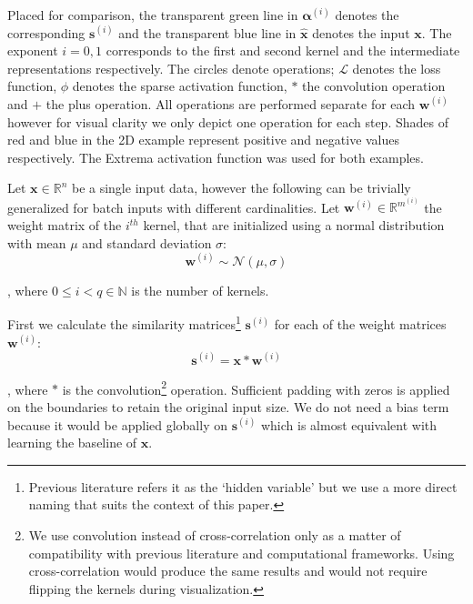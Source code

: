 \documentclass[journal]{IEEEtran}
\begin{document}
\begin{figure*}[!t]
{	Placed for comparison, the transparent green line in $\bm{\alpha}^{(i)}$ denotes the corresponding $\bm{s}^{(i)}$ and the transparent blue line in $\hat{\bm{x}}$ denotes the input $\bm{x}$.
	The exponent $i=0,1$ corresponds to the first and second kernel and the intermediate representations respectively.
	The circles denote operations; $\mathcal{L}$ denotes the loss function, $\phi$ denotes the sparse activation function, $\ast$ the convolution operation and $+$ the plus operation.
	All operations are performed separate for each $\bm{w}^{(i)}$ however for visual clarity we only depict one operation for each step.
	Shades of red and blue in the 2D example represent positive and negative values respectively.
	The Extrema activation function was used for both examples.
	}
	\label{fig:sans}
\end{figure*}

Let $\bm{x} \in \mathbb{R}^n$ be a single input data, however the following can be trivially generalized for batch inputs with different cardinalities.
Let $\bm{w}^{(i)} \in \mathbb{R}^{m^{(i)}}$ the weight matrix of the $i^{th}$ kernel, that are initialized using a normal distribution with mean $\mu$ and standard deviation $\sigma$:
\begin{equation}
	\label{eq:weightinitialization}
	\bm{w}^{(i)} \sim \mathcal{N}(\mu, \sigma)
\end{equation}

\noindent
, where $0\le i < q \in \mathbb{N}$ is the number of kernels.

First we calculate the similarity matrices\footnote{Previous literature refers it as the `hidden variable' but we use a more direct naming that suits the context of this paper.} $\bm{s}^{(i)}$ for each of the weight matrices $\bm{w}^{(i)}$:
\begin{equation}
	\label{eq:similarity}
	\bm{s}^{(i)} = \bm{x} * \bm{w}^{(i)}
\end{equation}

\noindent
, where $*$ is the convolution\footnote{We use convolution instead of cross-correlation only as a matter of compatibility with previous literature and computational frameworks. Using cross-correlation would produce the same results and would not require flipping the kernels during visualization.} operation.
Sufficient padding with zeros is applied on the boundaries to retain the original input size.
We do not need a bias term because it would be applied globally on $\bm{s}^{(i)}$ which is almost equivalent with learning the baseline of $\bm{x}$.
\end{document}
